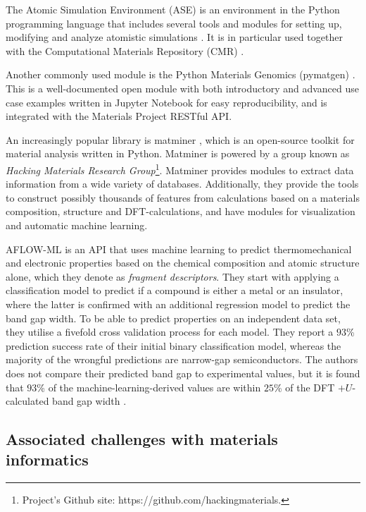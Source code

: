 The Atomic Simulation Environment (ASE) is an environment in the Python programming language that includes several tools and modules for setting up, modifying and analyze atomistic simulations \cite{Larsen2017}. It is in particular used together with the Computational Materials Repository (CMR) \cite{Landis2012}.

Another commonly used module is the Python Materials Genomics (pymatgen) \cite{Ong2013}. This is a well-documented open module with both introductory and advanced use case examples written in Jupyter Notebook for easy reproducibility, and is integrated with the Materials Project RESTful API.

An increasingly popular library is matminer \cite{Ward2018}, which is an open-source toolkit for material analysis written in Python. Matminer is powered by a group known as \textit{Hacking Materials Research Group}\footnote{Project's Github site: https://github.com/hackingmaterials.}. Matminer provides modules to extract data information from a wide variety of databases. Additionally, they provide the tools to construct possibly thousands of features from calculations based on a materials composition, structure and DFT-calculations, and have modules for visualization and automatic machine learning.

AFLOW-ML \cite{Isayev2017} is an API that uses machine learning to predict thermomechanical and electronic properties based on the chemical composition and atomic structure alone, which they denote as \textit{fragment descriptors}. They start with applying a classification model to predict if a compound is either a metal or an insulator, where the latter is confirmed with an additional regression model to predict the band gap width. To be able to predict properties on an independent data set, they utilise a fivefold cross validation process for each model. They report a $93$\% prediction success rate of their initial binary classification model, whereas the majority of the wrongful predictions are narrow-gap semiconductors. The authors does not compare their predicted band gap to experimental values, but it is found that $93$\% of the machine-learning-derived values are within $25$\% of the DFT $+U$-calculated band gap width \cite{Ferrenti2020}.

\subsection{Associated challenges with materials informatics}

